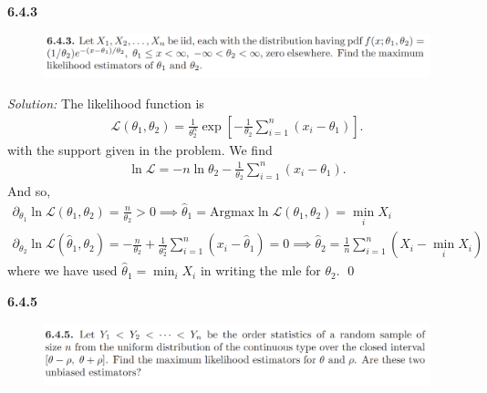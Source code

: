 \documentclass{book}
\theoremstyle{definition}
\newcommand{\p}{\partial}
\newcommand{\lag}{\mathcal{L}}
\newcommand{\nn}{\nonumber}
\newcommand{\f}[2]{\frac{#1}{#2}}
\newcommand{\lp}{\left(}
\newcommand{\rp}{\right)}
\newcommand{\lb}{\left[}
\newcommand{\rb}{\right]}
\begin{document}
\newpage
\noindent \textbf{6.4.3}
\begin{figure}[!htb]
	\centering
	\includegraphics[scale=0.6]{643}
\end{figure}

\noindent \textit{Solution:}  The likelihood function is 
\begin{align}
\lag(\theta_1, \theta_2) = \f{1}{\theta_2^n} \exp \lb -\f{1}{\theta_2}\sum^n_{i=1} (x_i - \theta_1) \rb.
\end{align}
with the support given in the problem. We find 
\begin{align}
\ln \lag = -n \ln \theta_2 - \f{1}{\theta_2}\sum^n_{i=1}(x_i - \theta_1).
\end{align}
And so,
\begin{align}
\p_{\theta_1} \ln \lag(\theta_1,\theta_2) = \f{n}{\theta_2} > 0  \implies \boxed{\hat\theta_1 = \text{Argmax}\ln\lag(\theta_1,\theta_2) = \min_i X_i }\nn\\
\p_{\theta_2} \ln \lag(\hat\theta_1,\theta_2) = -\f{n}{\theta_2} + \f{1}{\theta_2^2} \sum^n_{i=1}\lp x_i - \hat\theta_1 \rp = 0 \implies \boxed{\hat\theta_2 = \f{1}{n}\sum^n_{i=1}(X_i - \min_i X_i) }
\end{align}
where we have used $\hat\theta_1 = \min_i X_i$ in writing the mle for $\theta_2$. \qed


\newpage
\noindent \textbf{6.4.5}
\begin{figure}[!htb]
	\centering
	\includegraphics[scale=0.6]{645}
\end{figure}
\end{document}
